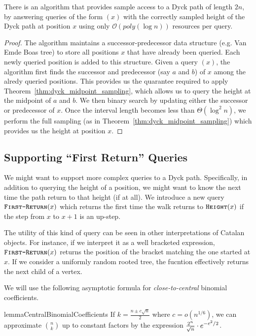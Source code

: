 \begin{theorem}
\label{thm:dyck_height_sampling}
There is an algorithm that provides sample access to a Dyck path of length $2n$,
by answering queries of the form $(x)$ with the correctly sampled height of the Dyck path at position $x$
using only $\mathcal O(poly(\log n))$ resources per query.
\end{theorem}
\begin{proof}
The algorithm maintains a successor-predecessor data structure (e.g. Van Emde Boas tree)
to store all positions $x$ that have already been queried.
Each newly queried position is added to this structure.
Given a query $(x)$, the algorithm first finds the successor and predecessor
(say $a$ and $b$) of $x$ among the alredy queried positions.
This provides us the quarantee required to apply Theorem~\ref{thm:dyck_midpoint_sampling},
which allows us to query the height at the midpoint of $a$ and $b$.
We then binary search by updating either the successor or predecessor of $x$.
Once the interval length becomes less than $\Theta(\log^2 n)$,
we perform the full sampling (as in Theorem~\ref{thm:dyck_midpoint_sampling}) which provides us the height at position $x$.
\end{proof}




\subsection{Supporting ``First Return'' Queries}%
\label{sec:supporting_first_return_queries}

We might want to support more complex queries to a Dyck path.
Specifically, in addition to querying the height of a position,
we might want to know the next time the path return to that height (if at all).
We introduce a new query $\texttt{\textsc{First-Return}}(x)$ which returns the first time the walk returns to
$\texttt{\textsc{Height}}(x)$ if the step from $x$ to $x+1$ is an up-step.

The utility of this kind of query can be seen in other interpretations of Catalan objects.
For instance, if we interpret it as a well bracketed expression,
$\texttt{\textsc{First-Return}}(x)$ returns the position of the bracket matching the one started at $x$.
If we consider a uniformly random rooted tree, the fucntion effectively returns the next child of a vertex.

We will use the following asymptotic formula for \emph{close-to-central} binomial coefficients.
\begin{restatable}{lemma}{CentralBinomialCoefficients}
\label{lem:CentralBinomialCoefficients}
If $k = \frac{n \pm c\sqrt n}{2}$ where $c = o(n^{1/6})$,
we can approximate $\binom{n}{k}$ up to constant factors by the expression $\frac{2^n}{\sqrt n}\cdot \mathlarger e^{-c^2/2}$.
\end{restatable}

